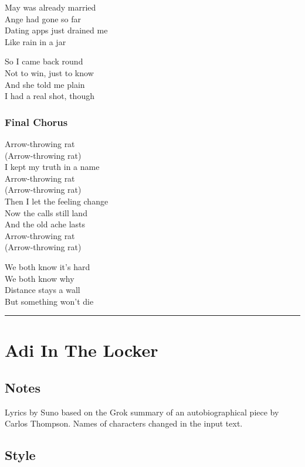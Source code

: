 May was already married\\
Ange had gone so far\\
Dating apps just drained me\\
Like rain in a jar

So I came back round\\
Not to win, just to know\\
And she told me plain\\
I had a real shot, though

\subsubsection{Final Chorus}\label{final-chorus-6}

Arrow-throwing rat\\
(Arrow-throwing rat)\\
I kept my truth in a name\\
Arrow-throwing rat\\
(Arrow-throwing rat)\\
Then I let the feeling change\\
Now the calls still land\\
And the old ache lasts\\
Arrow-throwing rat\\
(Arrow-throwing rat)

We both know it's hard\\
We both know why\\
Distance stays a wall\\
But something won't die

\begin{center}\rule{0.5\linewidth}{0.5pt}\end{center}

\section{Adi In The Locker}\label{adi-in-the-locker}

\subsection{Notes}\label{notes-25}

Lyrics by Suno based on the Grok summary of an autobiographical piece by
Carlos Thompson. Names of characters changed in the input text.

\subsection{Style}\label{style-24}

